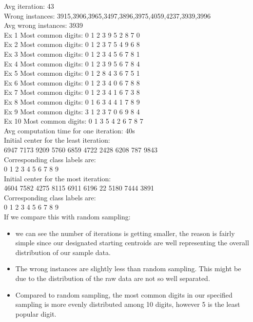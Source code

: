 \documentclass[paper=a4, fontsize=11pt]{scrartcl} %
\numberwithin{equation}{section} %
\numberwithin{figure}{section} %
\numberwithin{table}{section} %
\begin{document}
Avg iteration: 43\\

Wrong instances: 3915,3906,3965,3497,3896,3975,4059,4237,3939,3996		\\			

Avg wrong instances: 3939\\

Ex 1 Most common digits: 0 1 2 3 9 5 2 8 7 0 \\
Ex 2 Most common digits: 0 1 2 3 7 5 4 9 6 8\\
Ex 3 Most common digits: 0 1 2 3 4 5 6 7 8 1\\
Ex 4 Most common digits: 0 1 2 3 9 5 6 7 8 4 \\
Ex 5 Most common digits: 0 1 2 8 4 3 6 7 5 1\\
Ex 6 Most common digits: 0 1 2 3 4 0 6 7 8 8\\
Ex 7 Most common digits: 0 1 2 3 4 1 6 7 3 8\\
Ex 8 Most common digits: 0 1 6 3 4 4 1 7 8 9\\
Ex 9 Most common digits: 3 1 2 3 7 0 6 9 8 4\\
Ex 10 Most common digits: 0 1 3 5 4 2 6 7 8 7\\

Avg computation time for one iteration: 40s\\

Initial center for the least iteration:\\

6947 7173 9209 5760 6859 4722 2428 6208 787 9843 \\
Corresponding class labels are:\\
0 1 2 3 4 5 6 7 8 9 \\

Initial center for the most iteration:\\
4604 7582 4275 8115 6911 6196 22 5180 7444 3891 \\
Corresponding class labels are:\\
0 1 2 3 4 5 6 7 8 9 \\

If we compare this with random sampling: \\
\begin{itemize}
\item we can see the number of iterations is getting smaller, the reason is fairly simple since our designated starting centroids are well representing the overall distribution of our sample data.
\item The wrong instances are slightly less than random sampling. This might be due to the distribution of the raw data are not so well separated.
\item Compared to random sampling, the most common digits in our specified sampling is more evenly distributed among 10 digits, however 5 is the least popular digit. 
\end{itemize}
\end{document}
